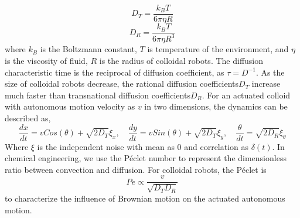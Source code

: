 \begin{equation}
    D_T=\frac{k_B T}{6 \pi \eta R }
\end{equation}
\begin{equation}
    D_R=\frac{k_B T}{6 \pi \eta R^3 }
\end{equation}
where $k_B$ is the Boltzmann constant, $T$ is temperature of the environment, and $\eta$ is the viscosity of fluid, $R$ is the radius of colloidal robots. The diffusion characteristic time is the 
reciprocal of diffusion coefficient, as  $\tau=D^{-1}$. As the size of colloidal robots decrease, the rational diffusion coefficients$D_T$ increase much faster than transnational diffusion coefficients$D_R$. For an actuated colloid with autonomous motion velocity as $v$ in two dimensions, the dynamics can be described as,
\begin{equation}
    \frac{dx}{dt}=v Cos(\theta)+\sqrt{2 D_T}\xi_x, \quad \frac{dy}{dt}=v Sin(\theta)+\sqrt{2 D_T}\xi_y,\quad
    \frac{\theta}{dt}=\sqrt{2 D_R}\xi_\theta
\end{equation}
Where $\xi$ is the independent noise with mean as $0$ and correlation as $\delta(t)$. In chemical engineering, we use the Péclet number to represent the dimensionless ratio between convection  and diffusion. For colloidal robots, the Péclet is 
\begin{equation}
    Pe\propto\frac{v}{\sqrt{D_T D_R}}
\end{equation}
to characterize the influence of Brownian motion on the actuated autonomous motion.

